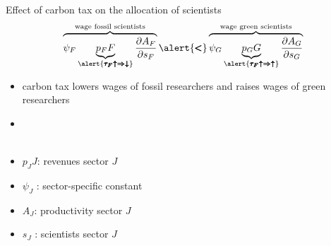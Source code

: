 \documentclass[11pt,aspectratio=169]{beamer}
\begin{document}
\addtocounter{framenumber}{-1}

\begin{frame}{Effect of carbon tax on the allocation of scientists}
	\vspace{2mm}
	\begin{align*}
		\overbrace{{\psi_F} \underbrace{p_F{F}}_{\alert{\pmb{\tau_F\uparrow\Rightarrow\downarrow}}}\frac{\partial A_{F}}{\partial s_{F}}}^{\text{wage fossil scientists}}\alert{\pmb{<}}\overbrace{{\psi_G} \underbrace{p_G{G}}_{\alert{\pmb{\tau_F\uparrow\Rightarrow\uparrow}}}\frac{\partial A_{G}}{\partial s_{G}}}^{\text{wage green scientists}}
	\end{align*}
	\normalsize
	\begin{itemize}
		\item carbon tax lowers wages of fossil researchers and raises wages of green researchers
		\vspace{2mm}
		\item[] \ \\ \ %
	\end{itemize}
	\small
	\vspace{2.6mm}
	\hspace{-2mm}
	\begin{minipage}[t!]{0.4\textwidth}
		\vspace{0mm}
		\begin{itemize}
			\item[] $p_JJ$: revenues sector $J$
			\vspace{-2mm}
			\item[] $\psi_J$ : sector-specific constant
		\end{itemize}
	\end{minipage}
	\vspace{-5mm}
	\begin{minipage}[t!]{0.5\textwidth}
		\vspace{0mm}
		\begin{itemize}	
			\item[] $A_J$: productivity sector $J$
			\vspace{-2mm}			
			\item[] $s_J$ : scientists sector $J$
		\end{itemize}
	\end{minipage}
\end{frame}

\addtocounter{framenumber}{-1}
\end{document}
